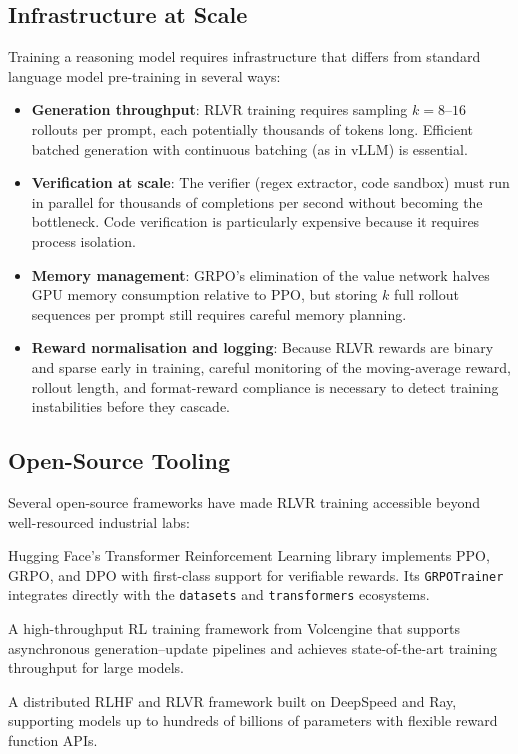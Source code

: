 \subsection{Infrastructure at Scale}
\label{subsec:infra}

Training a reasoning model requires infrastructure that differs from
standard language model pre-training in several ways:

\begin{itemize}[leftmargin=*]
\item \textbf{Generation throughput}: RLVR training requires sampling
  $k = 8$--$16$ rollouts per prompt, each potentially thousands of
  tokens long. Efficient batched generation with continuous batching
  (as in vLLM) is essential.

\item \textbf{Verification at scale}: The verifier (regex extractor,
  code sandbox) must run in parallel for thousands of completions per
  second without becoming the bottleneck. Code verification is
  particularly expensive because it requires process isolation.

\item \textbf{Memory management}: GRPO's elimination of the value
  network halves GPU memory consumption relative to PPO, but storing
  $k$ full rollout sequences per prompt still requires careful memory
  planning.

\item \textbf{Reward normalisation and logging}: Because RLVR rewards
  are binary and sparse early in training, careful monitoring of the
  moving-average reward, rollout length, and format-reward compliance
  is necessary to detect training instabilities before they cascade.
\end{itemize}

\subsection{Open-Source Tooling}
\label{subsec:open-source-tooling}

Several open-source frameworks have made RLVR training accessible
beyond well-resourced industrial labs:

\begin{description}[leftmargin=!,labelwidth=2.5cm]
\item[TRL] Hugging Face's Transformer Reinforcement Learning library
  implements PPO, GRPO, and DPO with first-class support for
  verifiable rewards. Its \texttt{GRPOTrainer} integrates directly
  with the \texttt{datasets} and \texttt{transformers} ecosystems.

\item[veRL] A high-throughput RL training framework from Volcengine
  that supports asynchronous generation--update pipelines and
  achieves state-of-the-art training throughput for large models.

\item[OpenRLHF] A distributed RLHF and RLVR framework built on
  DeepSpeed and Ray, supporting models up to hundreds of billions of
  parameters with flexible reward function APIs.
\end{description}

